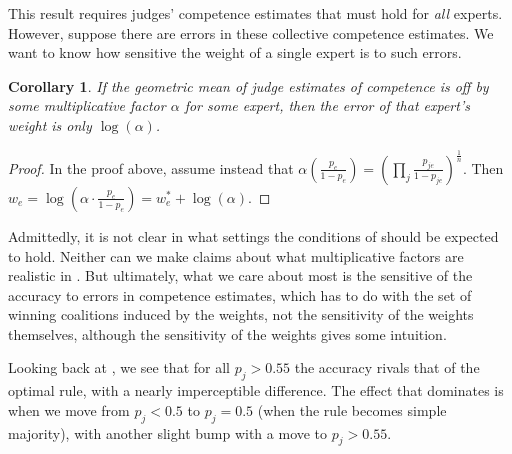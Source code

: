 \documentclass[letterpaper]{article} %
\newtheorem{corollary}{Corollary}
\newcommand{\judge}{\ensuremath{j} }
\newcommand{\expert}{\ensuremath{e} }
\newcommand{\ben}[1]{\textcolor{red}{Ben says: #1}}
\newcommand{\omer}[1]{\textcolor{purple}{Omer says: #1}}
\begin{document}
This result requires judges' competence estimates that must hold for \emph{all} experts. However, suppose there are errors in these collective competence estimates. We want to know how sensitive the weight of a single expert is to such errors.

\begin{corollary}\label{corollary:optimal}
If the geometric mean of judge estimates of competence is off by some multiplicative factor $\alpha$ for some expert, then the error of that expert's weight is only $\log(\alpha)$.
\end{corollary}

\begin{proof}
In the proof above, assume instead that $\alpha \left( \frac{p_\expert}{1-p_\expert} \right) = (\prod\limits_\judge \frac{p_{\judge\expert}}{1-p_{\judge\expert}} )^\frac{1}{n}$. Then
%
 $w_\expert = \log ( \alpha \cdot \frac{p_\expert}{1-p_\expert}) = w^*_\expert + \log(\alpha)$.
\end{proof}



Admittedly, it is not clear in what settings the conditions of  should be expected to hold. Neither can we make claims about what multiplicative factors are realistic in . But ultimately, what we care about most is the sensitive of the accuracy to errors in competence estimates, which has to do with the set of winning coalitions induced by the weights, not the sensitivity of the weights themselves, although the sensitivity of the weights gives some intuition.

Looking back at , we see that %
for all $p_j > 0.55$ the accuracy rivals that of the optimal rule, with a nearly imperceptible difference. The effect that dominates  is when we move from $p_j < 0.5$ to $p_j = 0.5$ (when the rule becomes simple majority), with another slight bump with a move to $p_j > 0.55$.%
\end{document}
